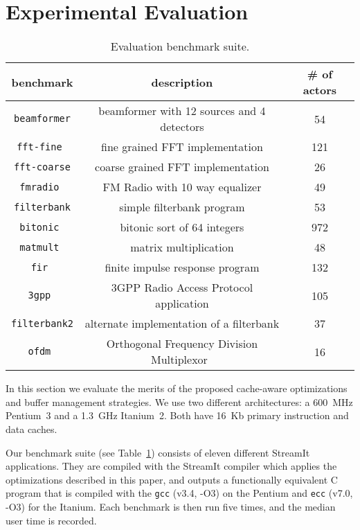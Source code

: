 \section{Experimental Evaluation}
\label{sec:evaluation}

\begin{table}[t]
\center
\label{tab:benchmarks}
\vspace{-12pt}
{\tiny
\begin{tabular}{|c|c|c|} \hline
{\bf benchmark}&{\bf description}&{\bf \# of actors}\\ \hline \hline
\texttt{beamformer} &beamformer with 12 sources and 4 detectors& 54 \\ \hline
\texttt{fft-fine	} &fine grained FFT implementation	&	121 \\ \hline
\texttt{fft-coarse} &coarse grained FFT implementation	&	26 \\ \hline
\texttt{fmradio	} &FM Radio with 10 way equalizer	&	49 \\ \hline
\texttt{filterbank} &simple filterbank program	&	53 \\ \hline
\texttt{bitonic	} &bitonic sort of 64 integers	&	972 \\ \hline
\texttt{matmult	} &matrix multiplication	&	48 \\ \hline
\texttt{fir	      } &finite impulse response program	&	132 \\ \hline
\texttt{3gpp	} &3GPP Radio Access Protocol application	&	105 \\ \hline
\texttt{filterbank2}&alternate implementation of a filterbank &	37 \\ \hline
\texttt{ofdm	 }& Orthogonal Frequency Division Multiplexor~\cite{spectrumware}	&	16 \\ \hline
\end{tabular}
}
\vspace{-12pt}
\caption{Evaluation benchmark suite.}
\end{table}


In this section we evaluate the merits of the proposed cache-aware
optimizations and buffer management strategies. We use two
different architectures: a 600~MHz Pentium~3 and a 1.3~GHz
Itanium~2. Both have 16~Kb primary instruction and data caches.

Our benchmark suite (see Table~\ref{tab:benchmarks}) consists of eleven
different StreamIt applications. They are compiled with the StreamIt
compiler which applies the optimizations described in this paper, and
outputs a functionally equivalent C program that is compiled with the
\texttt{gcc} (v3.4, -O3) on the Pentium and \texttt{ecc} 
(v7.0, -O3) for the Itanium. Each benchmark is
then run five times, and the median user time is recorded.

